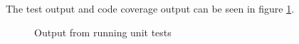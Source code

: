 The test output and code coverage output can be seen in figure \ref{fig:test-out}.
\begin{figure}[!htb]
	\centering
	\qquad
	\caption{Output from running unit tests}
	\label{fig:test-out}
\end{figure}